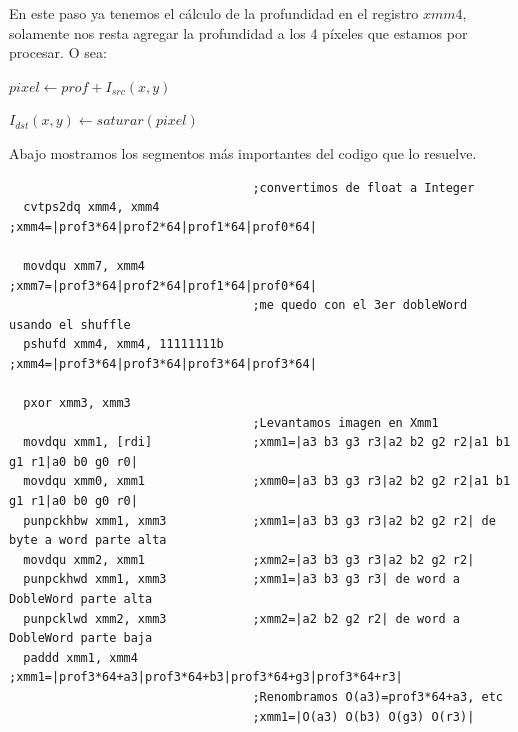En este paso ya tenemos el cálculo de la profundidad en el registro $xmm4$, solamente nos resta agregar la profundidad a los 4 píxeles que estamos por procesar. O sea:

\begin{center}
       $pixel \gets prof + I_{src}(x, y)$    
      
      $I_{dst}(x, y) \gets saturar(pixel)$
\end{center}

Abajo mostramos los segmentos más importantes del codigo que lo resuelve.

\begin{codesnippet}
\begin{verbatim}
                                  ;convertimos de float a Integer
  cvtps2dq xmm4, xmm4             ;xmm4=|prof3*64|prof2*64|prof1*64|prof0*64|

  movdqu xmm7, xmm4               ;xmm7=|prof3*64|prof2*64|prof1*64|prof0*64|
                                  ;me quedo con el 3er dobleWord usando el shuffle
  pshufd xmm4, xmm4, 11111111b    ;xmm4=|prof3*64|prof3*64|prof3*64|prof3*64|

  pxor xmm3, xmm3
                                  ;Levantamos imagen en Xmm1
  movdqu xmm1, [rdi]              ;xmm1=|a3 b3 g3 r3|a2 b2 g2 r2|a1 b1 g1 r1|a0 b0 g0 r0|			
  movdqu xmm0, xmm1               ;xmm0=|a3 b3 g3 r3|a2 b2 g2 r2|a1 b1 g1 r1|a0 b0 g0 r0|
  punpckhbw xmm1, xmm3            ;xmm1=|a3 b3 g3 r3|a2 b2 g2 r2| de byte a word parte alta
  movdqu xmm2, xmm1               ;xmm2=|a3 b3 g3 r3|a2 b2 g2 r2| 
  punpckhwd xmm1, xmm3            ;xmm1=|a3 b3 g3 r3| de word a DobleWord parte alta
  punpcklwd xmm2, xmm3            ;xmm2=|a2 b2 g2 r2| de word a DobleWord parte baja
  paddd xmm1, xmm4                ;xmm1=|prof3*64+a3|prof3*64+b3|prof3*64+g3|prof3*64+r3|
                                  ;Renombramos O(a3)=prof3*64+a3, etc
                                  ;xmm1=|O(a3) O(b3) O(g3) O(r3)|
\end{verbatim}
\end{codesnippet}

